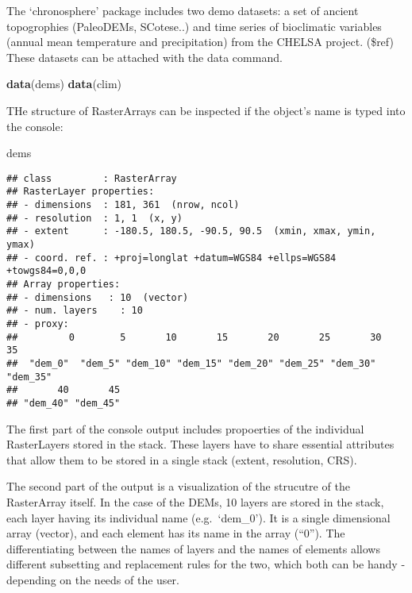 \documentclass[]{article}
\newenvironment{Shaded}{\begin{snugshade}}{\end{snugshade}}
\newcommand{\KeywordTok}[1]{\textcolor[rgb]{0.13,0.29,0.53}{\textbf{#1}}}
\newcommand{\NormalTok}[1]{#1}
\begin{document}
The `chronosphere' package includes two demo datasets: a set of ancient
topogrophies (PaleoDEMs, SCotese..) and time series of bioclimatic
variables (annual mean temperature and precipitation) from the CHELSA
project. (\$ref) These datasets can be attached with the data command.

\begin{Shaded}
\begin{Highlighting}[]
\KeywordTok{data}\NormalTok{(dems)}
\KeywordTok{data}\NormalTok{(clim)}
\end{Highlighting}
\end{Shaded}

THe structure of RasterArrays can be inspected if the object's name is
typed into the console:

\begin{Shaded}
\begin{Highlighting}[]
\NormalTok{dems}
\end{Highlighting}
\end{Shaded}

\begin{verbatim}
## class         : RasterArray 
## RasterLayer properties: 
## - dimensions  : 181, 361  (nrow, ncol)
## - resolution  : 1, 1  (x, y)
## - extent      : -180.5, 180.5, -90.5, 90.5  (xmin, xmax, ymin, ymax)
## - coord. ref. : +proj=longlat +datum=WGS84 +ellps=WGS84 +towgs84=0,0,0 
## Array properties: 
## - dimensions   : 10  (vector)
## - num. layers    : 10
## - proxy:
##         0        5       10       15       20       25       30       35 
##  "dem_0"  "dem_5" "dem_10" "dem_15" "dem_20" "dem_25" "dem_30" "dem_35" 
##       40       45 
## "dem_40" "dem_45"
\end{verbatim}

The first part of the console output includes propoerties of the
individual RasterLayers stored in the stack. These layers have to share
essential attributes that allow them to be stored in a single stack
(extent, resolution, CRS).

The second part of the output is a visualization of the strucutre of the
RasterArray itself. In the case of the DEMs, 10 layers are stored in the
stack, each layer having its individual name (e.g.~`dem\_0'). It is a
single dimensional array (vector), and each element has its name in the
array (``0''). The differentiating between the names of layers and the
names of elements allows different subsetting and replacement rules for
the two, which both can be handy - depending on the needs of the user.
\end{document}
